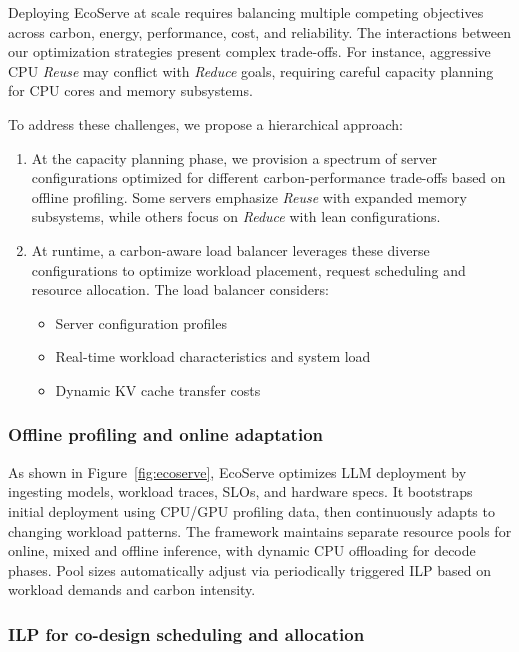 Deploying EcoServe at scale requires balancing multiple competing objectives across carbon, energy, performance, cost, and reliability. The interactions between our optimization strategies present complex trade-offs. For instance, aggressive CPU \textit{Reuse} may conflict with \textit{Reduce} goals, requiring careful capacity planning for CPU cores and memory subsystems.

To address these challenges, we propose a hierarchical approach:

\begin{enumerate}
    \item At the capacity planning phase, we provision a spectrum of server configurations optimized for different carbon-performance trade-offs based on offline profiling. Some servers emphasize \textit{Reuse} with expanded memory subsystems, while others focus on \textit{Reduce} with lean configurations.
    \item At runtime, a carbon-aware load balancer leverages these diverse configurations to optimize workload placement, request scheduling and resource allocation. The load balancer considers:
    \begin{itemize}
        \item Server configuration profiles
        \item Real-time workload characteristics and system load
        \item Dynamic KV cache transfer costs
    \end{itemize}
\end{enumerate}


\subsubsection{Offline profiling and online adaptation}
As shown in Figure~\ref{fig:ecoserve}, EcoServe optimizes LLM deployment by ingesting models, workload traces, SLOs, and hardware specs. It bootstraps initial deployment using CPU/GPU profiling data, then continuously adapts to changing workload patterns. The framework maintains separate resource pools for online, mixed and offline inference, with dynamic CPU offloading for decode phases. Pool sizes automatically adjust via periodically triggered ILP based on workload demands and carbon intensity.%

\subsubsection{ILP for co-design scheduling and allocation}

